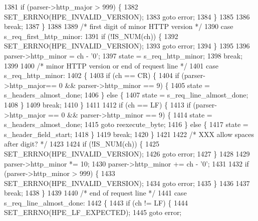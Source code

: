 \begin{DoxyCode}
1381         \textcolor{keywordflow}{if} (parser->http_major > 999) \{
1382           SET_ERRNO(HPE_INVALID_VERSION);
1383           \textcolor{keywordflow}{goto} error;
1384         \}
1385 
1386         \textcolor{keywordflow}{break};
1387       \}
1388 
1389       \textcolor{comment}{/* first digit of minor HTTP version */}
1390       \textcolor{keywordflow}{case} s_req_first_http_minor:
1391         \textcolor{keywordflow}{if} (!IS_NUM(ch)) \{
1392           SET_ERRNO(HPE_INVALID_VERSION);
1393           \textcolor{keywordflow}{goto} error;
1394         \}
1395 
1396         parser->http_minor = ch - \textcolor{charliteral}{'0'};
1397         state = s_req_http_minor;
1398         \textcolor{keywordflow}{break};
1399 
1400       \textcolor{comment}{/* minor HTTP version or end of request line */}
1401       \textcolor{keywordflow}{case} s_req_http_minor:
1402       \{
1403         \textcolor{keywordflow}{if} (ch == CR) \{
1404           \textcolor{keywordflow}{if} (parser->http_major== 0 && parser->http_minor == 9) \{
1405             state = s_headers_almost_done;
1406           \} \textcolor{keywordflow}{else} \{
1407             state = s_req_line_almost_done;
1408           \}
1409           \textcolor{keywordflow}{break};
1410         \}
1411 
1412         \textcolor{keywordflow}{if} (ch == LF) \{
1413           \textcolor{keywordflow}{if} (parser->http_major == 0 && parser->http_minor == 9) \{
1414             state = s_headers_almost_done;
1415             \textcolor{keywordflow}{goto} reexecute\_byte;
1416           \} \textcolor{keywordflow}{else} \{
1417             state = s_header_field_start;
1418           \}
1419           \textcolor{keywordflow}{break};
1420         \}
1421 
1422         \textcolor{comment}{/* XXX allow spaces after digit? */}
1423 
1424         \textcolor{keywordflow}{if} (!IS_NUM(ch)) \{
1425           SET_ERRNO(HPE_INVALID_VERSION);
1426           \textcolor{keywordflow}{goto} error;
1427         \}
1428 
1429         parser->http_minor *= 10;
1430         parser->http_minor += ch - \textcolor{charliteral}{'0'};
1431 
1432         \textcolor{keywordflow}{if} (parser->http_minor > 999) \{
1433           SET_ERRNO(HPE_INVALID_VERSION);
1434           \textcolor{keywordflow}{goto} error;
1435         \}
1436 
1437         \textcolor{keywordflow}{break};
1438       \}
1439 
1440       \textcolor{comment}{/* end of request line */}
1441       \textcolor{keywordflow}{case} s_req_line_almost_done:
1442       \{
1443         \textcolor{keywordflow}{if} (ch != LF) \{
1444           SET_ERRNO(HPE_LF_EXPECTED);
1445           \textcolor{keywordflow}{goto} error;

\end{DoxyCode}
